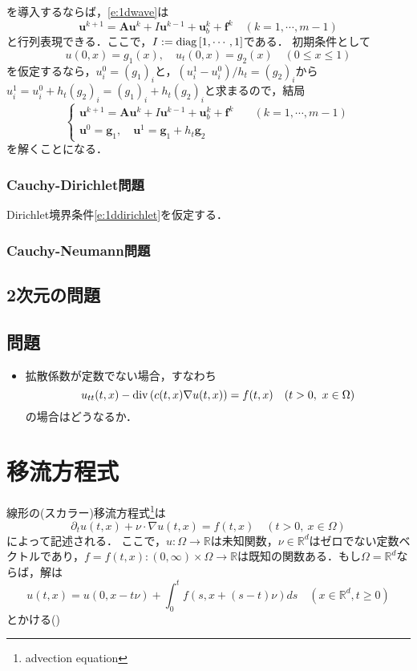 を導入するならば，\eqref{e:1dwave}は
$$
\bm{u}^{k+1} = \bm{A}\bm{u}^k + I\bm{u}^{k-1} + \bm{u}_b^k + \bm{f}^k\quad(k=1,\cdots,m-1)
$$
と行列表現できる．ここで，$I:=\operatorname{\mathrm{diag}\,}[1,\cdots,1]$である．
初期条件として
\begin{equation}
\label{e:1dwaveinitial}
u(0,x)=g_1(x),\quad u_t(0,x)=g_2(x)\quad(0\le x\le 1)
\end{equation}
を仮定するなら，$u_i^0=(g_1)_i$と，$(u_i^1-u_i^0)/h_t=(g_2)_i$から$u_i^1=u_i^0+h_t(g_2)_i=(g_1)_i+h_t(g_2)_i$と求まるので，結局
\begin{equation}
	\begin{cases}
		\bm{u}^{k+1} = \bm{A}\bm{u}^k + I\bm{u}^{k-1} + \bm{u}_b^k + \bm{f}^k\quad&(k=1,\cdots,m-1)\\
		\bm{u}^0=\bm{g}_1,\quad \bm{u}^1=\bm{g}_1+h_t\bm{g}_2&
	\end{cases}
\end{equation}
を解くことになる．

\subsubsection{Cauchy-Dirichlet問題}
Dirichlet境界条件\eqref{e:1ddirichlet}を仮定する．

\subsubsection{Cauchy-Neumann問題}

\subsection{2次元の問題}

\subsection{問題}
\begin{itemize}
\item 拡散係数が定数でない場合，すなわち
$$
u_{tt}(t,x)-\operatorname{\mathrm{div}\,}(c(t,x)\nabla u(t,x))=f(t,x)\quad(t>0,\ x\in\Omega)
$$
の場合はどうなるか．
\end{itemize}


\section{移流方程式}
線形の(スカラー)移流方程式\footnote{advection equation}は
\begin{equation}
\label{e:advection}
\partial_t u(t,x)+\nu\cdot\nabla u(t,x)=f(t,x)\quad(t>0,\ x\in\Omega)
\end{equation}
によって記述される．
ここで，$u:\Omega\to\mathbb{R}$は未知関数，$\nu\in\mathbb{R}^d$はゼロでない定数ベクトルであり，$f=f(t,x):(0,\infty)\times\Omega\to\mathbb{R}$は既知の関数ある．もし$\Omega=\mathbb{R}^d$ならば，解は
$$
u(t,x)=u(0,x-t\nu)+\int_0^t f(s,x+(s-t)\nu)ds\quad(x\in\mathbb{R}^d,t\ge0)
$$
とかける(\cite[Section 2.1.2]{evans})

